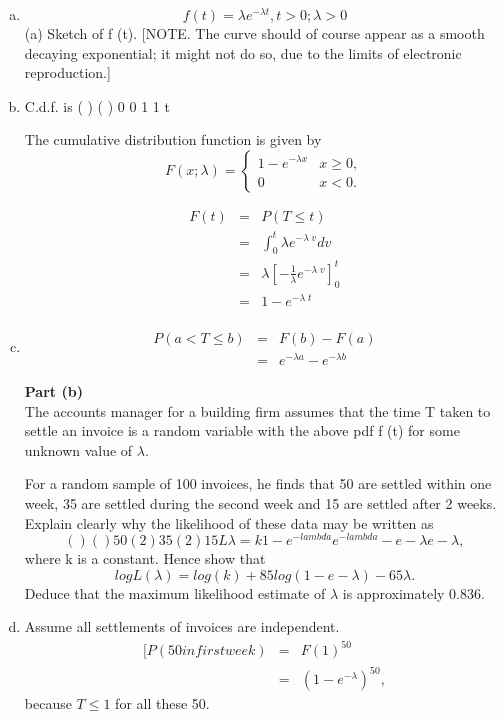 \documentclass[a4paper,12pt]{article}
\begin{document}
\begin{enumerate}[(a)]
\item  \[f (t ) =\lambda e^{-\lambda t}  , t > 0; \lambda > 0\]
(a) Sketch of f (t).
[NOTE. The curve should of course appear as a smooth decaying exponential;
it might not do so, due to the limits of electronic reproduction.]
\item C.d.f. is ( ) ( ) 0
0
1 1
t

The cumulative distribution function is given by 
\[ {\displaystyle F(x;\lambda )={\begin{cases}1-e^{-\lambda x}&x\geq 0,\\0&x<0.\end{cases}}} \]

\begin{eqnarray*}
F(t) &=& P(T \leq t) \\
&=& \int^{t}_{0} \lambda e^{-\lambda \; v} dv \\
&=& \lambda \left[  -\frac{1}{\lambda} e^{-\lambda \; v} \right]^{t}_{0} \\
&=& 1- e^{-\lambda \; t}\\
\end{eqnarray*}


\item 
\begin{eqnarray*}
P(a < T \leq b) &=& F (b) - F (a) \\ 
&=& e^{-\lambda a}  - e^{-\lambda b} 
\end{eqnarray*}
\newpage
\begin{framed}
\noindent \textbf{Part (b)}\\ 
The accounts manager for a building firm assumes that the time T taken to
settle an invoice is a random variable with the above pdf f (t) for some
unknown value of $\lambda$. 

For a random sample of 100 invoices, he finds that 50 are
settled within one week, 35 are settled during the second week and 15 are
settled after 2 weeks. Explain clearly why the likelihood of these data may be
written as
\[( ) ( )50 ( 2 )35 ( 2 )15 L λ = k 1− e^{-lambda} e^{-lambda} − e− λ e− λ ,\]
where k is a constant.
Hence show that
\[log L(\lambda ) = log(k ) + 85log (1− e−\lambda )− 65\lambda .\]
Deduce that the maximum likelihood estimate of $\lambda$ is approximately 0.836.
\end{framed}
\item Assume all settlements of invoices are independent.
\begin{eqnarray*}
[P(50 in first week) &=& F{ (1)}^{50}  \\
&=& \left(1- e^{-\lambda}\right)^{50}  ,
\end{eqnarray*} 
because $T \leq 1$ for all these 50.


\end{enumerate}
\end{document}
